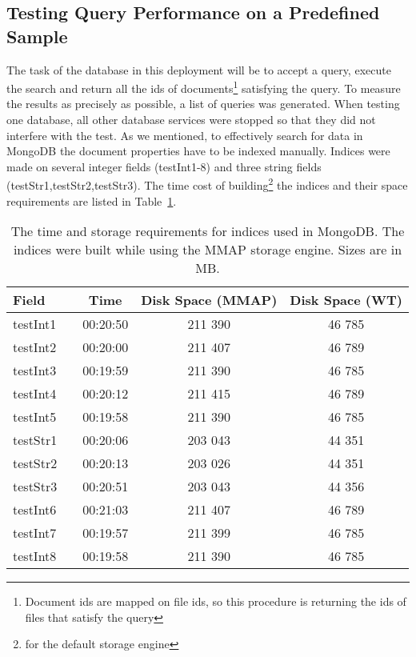 \subsection{Testing Query Performance on a Predefined Sample}

The task of the database in this deployment will be to accept a query, execute the search and return all the 
ids of documents\footnote{Document ids are mapped on file ids, so this procedure is returning the ids of files
that satisfy the query} satisfying the query. To measure the results as precisely as possible, a list of
queries was generated. When testing one database, all other database services were stopped so that they did not
interfere with the test. As we mentioned, to effectively search for data in MongoDB the document properties have to be 
indexed manually. Indices were made on several integer fields (testInt1-8) and three string fields 
(testStr1,testStr2,testStr3). The time cost of building\footnote{for the default storage engine} the 
indices and their space requirements are listed in Table~\ref{tab:indexBuildTimes}.

\begin{table}[h]
\centering
\begin{tabular}{lcccc}
\toprule
\textbf{Field}   & & \textbf{Time}     & \textbf{Disk Space (MMAP)} & \textbf{Disk Space (WT)} \\ \midrule
testInt1 & & 00:20:50 & 211 390           & 46 785          \\ \hline
testInt2 & & 00:20:00 & 211 407           & 46 789          \\ \hline
testInt3 & & 00:19:59 & 211 390           & 46 785          \\ \hline
testInt4 & & 00:20:12 & 211 415           & 46 789          \\ \hline
testInt5 & & 00:19:58 & 211 390           & 46 785          \\ \hline
testStr1 & & 00:20:06 & 203 043           & 44 351          \\ \hline
testStr2 & & 00:20:13 & 203 026           & 44 351          \\ \hline
testStr3 & & 00:20:51 & 203 043           & 44 356          \\ \hline
testInt6 & & 00:21:03 & 211 407           & 46 789          \\ \hline
testInt7 & & 00:19:57 & 211 399           & 46 785          \\ \hline
testInt8 & & 00:19:58 & 211 390           & 46 785          \\ \toprule
\end{tabular}
\caption{The time and storage requirements for indices used in MongoDB. The indices were built while using
the MMAP storage engine. Sizes are in MB.}
\label{tab:indexBuildTimes}
\end{table}


